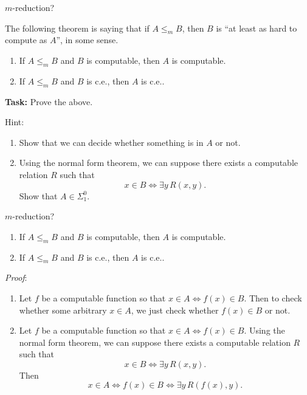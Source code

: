 \documentclass{beamer}
\begin{document}
\begin{frame}{$m$-reduction? \emojiflushed}

The following theorem is saying that if $A \leq_m B$, then $B$ is ``at least as hard to compute as $A$'', in some sense. 

\begin{theorem}
\begin{enumerate}
\item If $A \leq_m B$ and $B$ is computable, then $A$ is computable. 
\item If $A \leq_m B$ and $B$ is c.e., then $A$ is c.e..
\end{enumerate}
\end{theorem}


\textbf{Task:} Prove the above.

Hint: \begin{enumerate}
\item Show that we can decide whether something is in $A$ or not.
\item Using the normal form theorem, we can suppose there exists a computable relation $R$ such that
$$x \in B \Leftrightarrow \exists y \, R(x, y).$$
Show that $A \in \Sigma^0_1$.
\end{enumerate}

\end{frame}

\begin{frame}{$m$-reduction? \emojiflushed}
\begin{theorem}
\begin{enumerate}
\item If $A \leq_m B$ and $B$ is computable, then $A$ is computable. 
\item If $A \leq_m B$ and $B$ is c.e., then $A$ is c.e..
\end{enumerate}
\end{theorem}

\textit{Proof}: 
\begin{enumerate}
\item Let $f$ be a computable function so that $x \in A \Leftrightarrow f(x) \in B$. Then to check whether some arbitrary $x \in A$, we just check whether $f(x) \in B$ or not. 
\item Let $f$ be a computable function so that $x \in A \Leftrightarrow f(x) \in B$. Using the normal form theorem, we can suppose there exists a computable relation $R$ such that
$$x \in B \Leftrightarrow \exists y \, R(x, y).$$
Then
$$x \in A \Leftrightarrow f(x) \in B \Leftrightarrow \exists y \, R(f(x), y).$$
\end{enumerate}

\end{frame}
\end{document}
